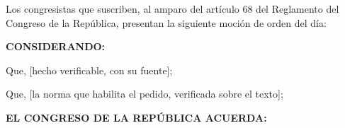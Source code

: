 \documentclass{mocion}
\begin{document}

\noindent Los congresistas que suscriben, al amparo del art\'iculo 68 del
Reglamento del Congreso de la Rep\'ublica, presentan la siguiente moci\'on de
orden del d\'ia:

\noindent\textbf{CONSIDERANDO:}

\noindent Que, [hecho verificable, con su fuente];

\noindent Que, [la norma que habilita el pedido, verificada sobre el texto];

\noindent\textbf{EL CONGRESO DE LA REP\'UBLICA ACUERDA:}


\firmaslegislativas
\end{document}
